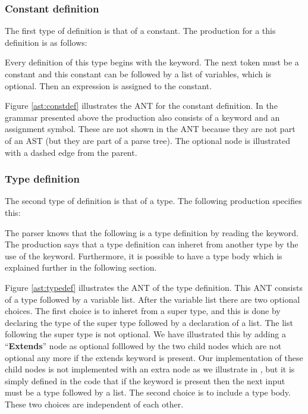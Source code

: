 \subsubsection{Constant definition}
The first type of definition is that of a constant. The production for a
this definition is as follows:

\begin{ebnf}
\end{ebnf}

Every definition of this type begins with the  keyword. The next
token must be a constant and this constant can be followed by a list of
variables, which is optional. Then an expression is assigned to the constant.



Figure \ref{ast:constdef} illustrates the ANT for the constant definition. In
the grammar presented above the production also consists of a keyword and an
assignment symbol. These are not shown in the ANT because they are not part 
of an AST (but they are part of a parse tree). The optional node is illustrated 
with a dashed edge from the parent.

\subsubsection{Type definition}

The second type of definition is that of a type. The following production
specifies this:

\begin{ebnf}
\end{ebnf}

The parser knows that the following is a type definition by reading the
 keyword. The production says that a type definition can inheret from
another type by the use of the  keyword. Furthermore, it is
possible to have a type body which is explained further in the following
section.



Figure \ref{ast:typedef} illustrates the ANT of the type
definition. This ANT consists of a type followed by a variable
list. After the variable list there are two optional choices. The first choice
is to inheret from a super type, and this is done by declaring the type of the super
type followed by a declaration of a list. The list following the super type is
not optional. We have illustrated this by adding a ``\textbf{Extends}'' node as
optional folllowed by the two child nodes which are not optional any more if the
extends keyword is present. Our implementation of these child nodes is not
implemented with an extra node as we illustrate in , but it 
is simply defined in the code that if the
keyword is present then the next input must be a type followed by a list.
The second choice is to include a type body. These two choices are independent
of each other.

